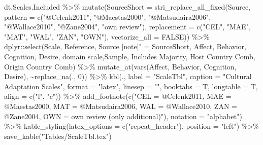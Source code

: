 \documentclass[
]{article}
\newenvironment{Shaded}{\begin{snugshade}}{\end{snugshade}}
\newcommand{\AttributeTok}[1]{\textcolor[rgb]{0.77,0.63,0.00}{#1}}
\newcommand{\ConstantTok}[1]{\textcolor[rgb]{0.00,0.00,0.00}{#1}}
\newcommand{\DecValTok}[1]{\textcolor[rgb]{0.00,0.00,0.81}{#1}}
\newcommand{\FunctionTok}[1]{\textcolor[rgb]{0.00,0.00,0.00}{#1}}
\newcommand{\NormalTok}[1]{#1}
\newcommand{\OtherTok}[1]{\textcolor[rgb]{0.56,0.35,0.01}{#1}}
\newcommand{\SpecialCharTok}[1]{\textcolor[rgb]{0.00,0.00,0.00}{#1}}
\newcommand{\StringTok}[1]{\textcolor[rgb]{0.31,0.60,0.02}{#1}}
\begin{document}
\begin{Shaded}
\begin{Highlighting}[]
\NormalTok{dt.Scales.Included }\SpecialCharTok{\%\textgreater{}\%}
  \FunctionTok{mutate}\NormalTok{(}\AttributeTok{SourceShort =} \FunctionTok{stri\_replace\_all\_fixed}\NormalTok{(Source,}
                                         \AttributeTok{pattern =} \FunctionTok{c}\NormalTok{(}\StringTok{"@Celenk2011"}\NormalTok{, }\StringTok{"@Maestas2000"}\NormalTok{, }\StringTok{"@Matsudaira2006"}\NormalTok{, }\StringTok{"@Wallace2010"}\NormalTok{, }\StringTok{"@Zane2004"}\NormalTok{, }\StringTok{"own review"}\NormalTok{), }
                                         \AttributeTok{replacement =} \FunctionTok{c}\NormalTok{(}\StringTok{"CEL"}\NormalTok{, }\StringTok{"MAE"}\NormalTok{, }\StringTok{"MAT"}\NormalTok{, }\StringTok{"WAL"}\NormalTok{, }\StringTok{"ZAN"}\NormalTok{, }\StringTok{"OWN"}\NormalTok{), }
                                         \AttributeTok{vectorize\_all =} \ConstantTok{FALSE}\NormalTok{)) }\SpecialCharTok{\%\textgreater{}\%}
\NormalTok{  dplyr}\SpecialCharTok{::}\FunctionTok{select}\NormalTok{(Scale, Reference, }\StringTok{\textasciigrave{}}\AttributeTok{Source [note]"}\StringTok{\textasciigrave{}} \OtherTok{=}\NormalTok{ SourceShort, }
\NormalTok{                Affect,     Behavior,   Cognition,  Desire,}
                \StringTok{\textasciigrave{}}\AttributeTok{domain scale}\StringTok{\textasciigrave{}}\NormalTok{,Sample,  }\StringTok{\textasciigrave{}}\AttributeTok{Includes Majority}\StringTok{\textasciigrave{}}\NormalTok{, }
                \StringTok{\textasciigrave{}}\AttributeTok{Host Country Comb}\StringTok{\textasciigrave{}}\NormalTok{,    }\StringTok{\textasciigrave{}}\AttributeTok{Origin Country Comb}\StringTok{\textasciigrave{}}\NormalTok{) }\SpecialCharTok{\%\textgreater{}\%}
  \FunctionTok{mutate\_at}\NormalTok{(}\FunctionTok{vars}\NormalTok{(Affect,    Behavior,   Cognition, Desire), }\SpecialCharTok{\textasciitilde{}}\FunctionTok{replace\_na}\NormalTok{(., }\DecValTok{0}\NormalTok{)) }\SpecialCharTok{\%\textgreater{}\%}
  \FunctionTok{kbl}\NormalTok{(., }
      \AttributeTok{label =} \StringTok{"ScaleTbl"}\NormalTok{,}
      \AttributeTok{caption =} \StringTok{"Cultural Adaptation Scales"}\NormalTok{,}
      \AttributeTok{format =} \StringTok{"latex"}\NormalTok{,}
      \AttributeTok{linesep =} \StringTok{""}\NormalTok{,}
      \AttributeTok{booktabs =}\NormalTok{ T,}
      \AttributeTok{longtable =}\NormalTok{ T,}
      \AttributeTok{align =} \FunctionTok{c}\NormalTok{(}\StringTok{"l"}\NormalTok{, }\StringTok{"c"}\NormalTok{))  }\SpecialCharTok{\%\textgreater{}\%}
  \FunctionTok{add\_footnote}\NormalTok{(}\FunctionTok{c}\NormalTok{(}\StringTok{"CEL = @Celenk2011, MAE = @Maestas2000, MAT = @Matsudaira2006, WAL = @Wallace2010, ZAN = @Zane2004, OWN = own review (only additional)"}\NormalTok{), }
               \AttributeTok{notation =} \StringTok{"alphabet"}\NormalTok{) }\SpecialCharTok{\%\textgreater{}\%}
  \FunctionTok{kable\_styling}\NormalTok{(}\AttributeTok{latex\_options =} \FunctionTok{c}\NormalTok{(}\StringTok{"repeat\_header"}\NormalTok{),}
                \AttributeTok{position =} \StringTok{"left"}\NormalTok{) }\SpecialCharTok{\%\textgreater{}\%}
  \FunctionTok{save\_kable}\NormalTok{(}\StringTok{"Tables/ScaleTbl.tex"}\NormalTok{)}
\end{Highlighting}
\end{Shaded}
\end{document}
